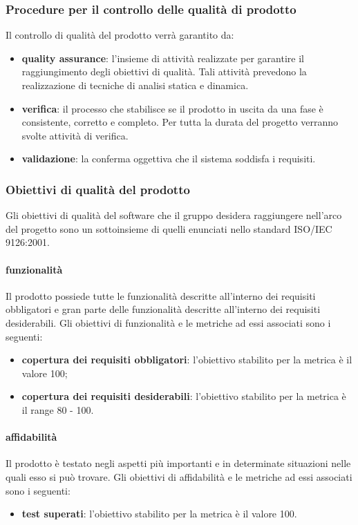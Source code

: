		\subsubsection{Procedure per il controllo delle qualità di prodotto}
		Il controllo di qualità del prodotto verrà garantito da:
		\begin{itemize}
			\item \textbf{quality assurance}: l'insieme di attività realizzate per garantire il raggiungimento degli obiettivi di qualità. Tali attività prevedono la realizzazione di tecniche di analisi statica e dinamica.
			\item \textbf{verifica}: il processo che stabilisce se il prodotto in uscita da una fase è consistente, corretto e completo. Per tutta la durata del progetto verranno svolte attività di verifica.
			\item \textbf{validazione}: la conferma oggettiva che il sistema soddisfa i requisiti.
		\end{itemize}
		\subsubsection{Obiettivi di qualità del prodotto}
		Gli obiettivi di qualità del software che il gruppo \hx{} desidera raggiungere nell'arco del progetto sono un sottoinsieme di quelli enunciati nello standard ISO/IEC 9126:2001.
		
		 	\paragraph{funzionalità}
		 	Il prodotto possiede tutte le funzionalità descritte all'interno dei requisiti obbligatori e gran parte delle funzionalità descritte all'interno dei requisiti desiderabili.
		 	Gli obiettivi di funzionalità e le metriche ad essi associati sono i seguenti:
		 	\begin{itemize}
				\item \textbf{copertura dei requisiti obbligatori}: l'obiettivo stabilito per la metrica è il valore 100;
				\item \textbf{copertura dei requisiti desiderabili}: l'obiettivo stabilito per la metrica è il range 80 - 100.
			\end{itemize}
		 	\paragraph{affidabilità}
		 	Il prodotto è testato negli aspetti più importanti e in determinate situazioni nelle quali esso si può trovare.
		 	Gli obiettivi di affidabilità e le metriche ad essi associati sono i seguenti:
		 	\begin{itemize}
				\item \textbf{test superati}: l'obiettivo stabilito per la metrica è il valore 100.
			\end{itemize}
